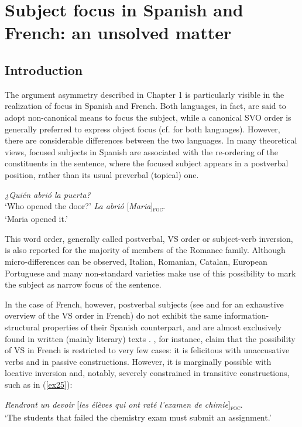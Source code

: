 
\chapter{Subject focus in Spanish and French: an unsolved matter}\label{sec:2}
\section{Introduction}

The argument asymmetry described in Chapter 1 is particularly visible in the realization of focus in Spanish and French. Both languages, in fact, are said to adopt non-canonical means to focus the subject, while a canonical SVO order is generally preferred to express object focus (cf. \cite{lambrecht1996information} for both languages). However, there are considerable differences between the two languages. In many theoretical views, focused subjects in Spanish are associated with the re-ordering of the constituents in the sentence, where the focused subject appears in a postverbal position, rather than its usual preverbal (topical) one. 

\ea \label{ex526}
\ea \textit{¿Quién abrió la puerta?}\\
 ‘Who opened the door?'
\ex \textit{La abrió} {[\textit{Maria}]\textsubscript{\textsc{foc}}}\normalsize.\\
`Maria opened it.'
\z \z 

This word order, generally called postverbal, VS order or subject-verb inversion, is also reported for the majority of members of the Romance family. Although micro-differences can be observed, Italian, Romanian, Catalan, European Portuguese and many non-standard varieties make use of this possibility to mark the subject as narrow focus of the sentence.

In the case of French, however, postverbal subjects (see \cite{lahousse2006} and \textcite{Lahousse2011} for an exhaustive overview of the VS order in French) do not exhibit the same information-structural properties of their Spanish counterpart, and are almost exclusively found in written (mainly literary) texts \parencite{delbecque2006estudio}. \textcite{dufter201614}, for instance, claim that the possibility of VS in French is restricted to very few cases:  it is felicitous with unaccusative verbs and in passive constructions. However, it is marginally possible with locative inversion and, notably, severely constrained in transitive constructions, such as in (\ref{ex25}): 

 \ea \label{ex25}
  \textit{Rendront un devoir} {[\textit{les élèves qui ont raté l’examen de chimie}]\textsubscript{\textsc{foc}}}\normalsize.\\
 `The students that failed the chemistry exam must submit an assignment.' \hfill \parencite[431]{dufter201614}    
\z

